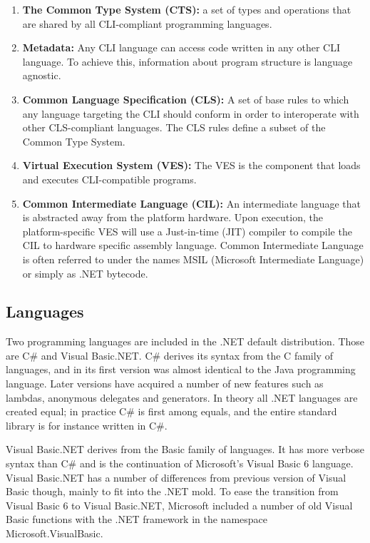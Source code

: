 	\begin{enumerate}
		
		\item \textbf{The Common Type System (CTS):} a set of types and operations 
		that are shared by all CLI-compliant programming languages.
		
		\item \textbf{Metadata:} Any CLI language can access code written in any 
		other CLI language. To achieve this, information about program structure is 
		language agnostic.
	
		\item \textbf{Common Language Specification (CLS):} A set of base rules to 
		which any language targeting the CLI should conform in order to interoperate 
		with other CLS-compliant languages. The CLS rules define a subset of the 
		Common Type System.
	
		\item \textbf{Virtual Execution System (VES):} The VES is the component that
		loads and executes CLI-compatible programs. 
	
		\item \textbf{Common Intermediate Language (CIL):} An intermediate language 
		that is abstracted away from the platform hardware. Upon execution, the 
		platform-specific VES will use a Just-in-time (JIT) compiler to compile the 
		CIL to hardware specific assembly language. Common Intermediate Language is 
		often referred to under the names MSIL (Microsoft Intermediate Language) or 
		simply as .NET bytecode.

	\end{enumerate}
    
\subsection{Languages}
	
	Two programming languages are included in the .NET default distribution. Those
	are C\# and Visual Basic.NET. C\# derives its syntax from the C family of 
	languages, and in its first version was almost identical to the Java 
	programming language. Later versions have acquired a number of new features 
	such as lambdas, anonymous delegates and generators. In theory all .NET 
	languages are created equal; in practice C\# is first among equals, and the 
	entire standard library is for instance written in C\#. 

	Visual Basic.NET derives from the Basic family of languages. It has more 
	verbose syntax than C\# and is the continuation of Microsoft's Visual Basic 6 
	language. Visual Basic.NET has a number of differences from previous version 
	of Visual Basic though, mainly to fit into the .NET mold. To ease the 
	transition from Visual Basic 6 to Visual Basic.NET, Microsoft included a 
	number of old Visual Basic functions with the .NET framework in the namespace 
	Microsoft.VisualBasic. 
	
